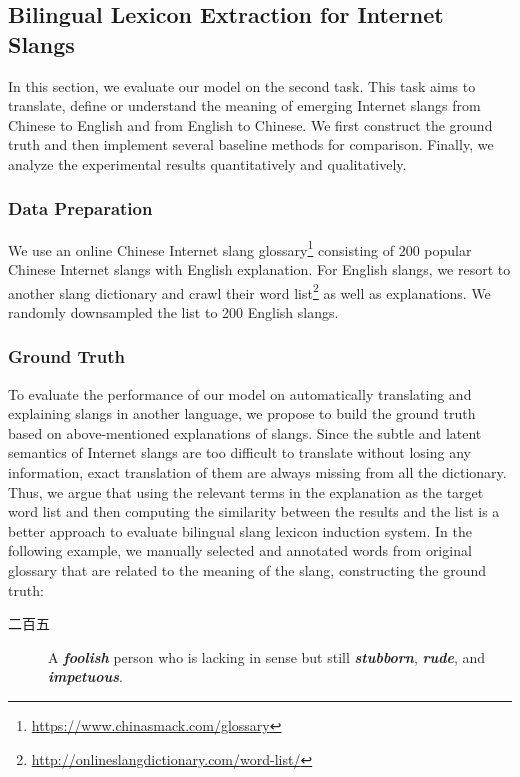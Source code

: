 \subsection{Bilingual Lexicon Extraction for Internet Slangs}
\label{sec:bleis}
In this section, we evaluate our model on the second task. This task aims to translate, define or understand the meaning of emerging Internet slangs from Chinese to English and from English to Chinese. We first construct the ground truth and then implement several baseline methods for comparison. Finally, we analyze the experimental results quantitatively and qualitatively.

\subsubsection{Data Preparation}
We use an online Chinese Internet slang glossary\footnote{\url{https://www.chinasmack.com/glossary}} consisting of  200 popular Chinese Internet slangs with English explanation. For English slangs, we resort to another slang dictionary and crawl their word list\footnote{\url{http://onlineslangdictionary.com/word-list/}} as well as explanations. We randomly downsampled the list to 200 English slangs.
\subsubsection{Ground Truth}
To evaluate the performance of our model on automatically translating and explaining slangs in another language, 
we propose to build the ground truth based on above-mentioned explanations of slangs. Since the subtle and latent semantics of Internet slangs are too difficult to translate without losing any information, exact translation of them are always missing from all the dictionary. Thus, we argue that using the relevant terms in the explanation as the target word list and then computing the similarity between the results and the list is a better approach to evaluate bilingual slang lexicon induction system.
In the following example, we manually selected and annotated words from original glossary that are related to the meaning of the slang, constructing the ground truth:
\begin{description}
	\item[二百五] A \textbf{\textit{foolish}} person who is lacking in sense but still \textbf{\textit{stubborn}}, \textbf{\textit{rude}}, and \textbf{\textit{impetuous}}.
\end{description}

